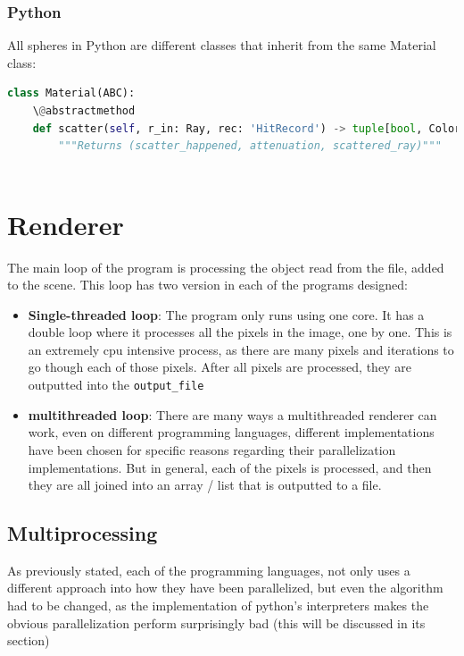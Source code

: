 \subsubsection{Python}
All spheres in Python are different classes that inherit from the same Material class:
\begin{lstlisting}[language=Python, caption={Python abscract class.}, label={lst:python_material_abstract}]
class Material(ABC):
    \@abstractmethod
    def scatter(self, r_in: Ray, rec: 'HitRecord') -> tuple[bool, Color, Ray]:
        """Returns (scatter_happened, attenuation, scattered_ray)"""
        
\end{lstlisting}
    


\section{Renderer}
\label{sec:renderer}
The main loop of the program is processing the object read from the file, added to the scene. 
This loop has two version in each of the programs designed:
\begin{itemize}
    \item \textbf{Single-threaded loop}: The program only runs using one core. It has a double loop where it processes all the pixels in the image, one by one. This is an extremely \gls{cpu} intensive process, as there are many pixels and iterations to go though each of those pixels. After all pixels are processed, they are outputted into the \texttt{output\_file}
    
    \item \textbf{multithreaded loop}: There are many ways a multithreaded renderer can work, even on different programming languages, different implementations have been chosen for specific reasons regarding their parallelization implementations. But in general, each of the pixels is processed, and then they are all joined into an array / list that is outputted to a file.
\end{itemize}


\subsection{Multiprocessing}
As previously stated, each of the programming languages, not only uses a different approach into how they have been parallelized, but even the algorithm had to be changed, as the implementation of python's interpreters makes the obvious parallelization perform surprisingly bad (this will be discussed in its section)

